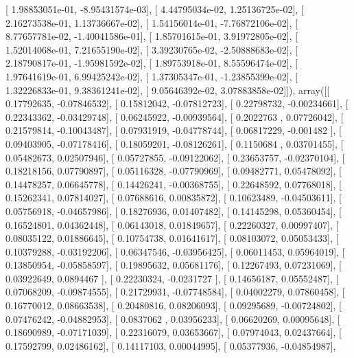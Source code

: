 \documentclass{article}
\begin{document}
       [  1.98853051e-01,  -8.95431574e-03],
       [  4.44795034e-02,   1.25136725e-02],
       [  2.16273538e-01,   1.13736667e-02],
       [  1.54156014e-01,  -7.76872106e-02],
       [  8.77657781e-02,  -1.40041586e-01],
       [  1.85701615e-01,   3.91972805e-02],
       [  1.52014068e-01,   7.21655190e-02],
       [  3.39230765e-02,  -2.50888683e-02],
       [  2.18790817e-01,  -1.95981592e-02],
       [  1.89753918e-01,   8.55596474e-02],
       [  1.97641619e-01,   6.99425242e-02],
       [  1.37305347e-01,  -1.23855399e-02],
       [  1.32226833e-01,   9.38361241e-02],
       [  9.05646392e-02,   3.07883858e-02]]), array([[ 0.17792635, -0.07846532],
       [ 0.15812042, -0.07812723],
       [ 0.22798732, -0.00234661],
       [ 0.22343362, -0.03429748],
       [ 0.06245922, -0.00939564],
       [ 0.2022763 ,  0.07726042],
       [ 0.21579814, -0.10043487],
       [ 0.07931919, -0.04778744],
       [ 0.06817229, -0.001482  ],
       [ 0.09403905, -0.07178416],
       [ 0.18059201, -0.08126261],
       [ 0.1150684 ,  0.03701455],
       [ 0.05482673,  0.02507946],
       [ 0.05727855, -0.09122062],
       [ 0.23653757, -0.02370104],
       [ 0.18218156,  0.07790897],
       [ 0.05116328, -0.07790969],
       [ 0.09482771,  0.05478092],
       [ 0.14478257,  0.06645778],
       [ 0.14426241, -0.00368755],
       [ 0.22648592,  0.07768018],
       [ 0.15262341,  0.07814027],
       [ 0.07688616,  0.00835872],
       [ 0.10623489, -0.04503611],
       [ 0.05756918, -0.04657986],
       [ 0.18276936,  0.01407482],
       [ 0.14145298,  0.05360454],
       [ 0.16524801,  0.04362448],
       [ 0.06143018,  0.01849657],
       [ 0.22260327,  0.00997407],
       [ 0.08035122,  0.01886645],
       [ 0.10754738,  0.01641617],
       [ 0.08103072,  0.05053433],
       [ 0.10379288, -0.03192206],
       [ 0.06347546, -0.03956425],
       [ 0.06011453,  0.05964019],
       [ 0.13850954, -0.05858597],
       [ 0.19895632,  0.05681176],
       [ 0.12267493,  0.07231069],
       [ 0.03922649,  0.0894467 ],
       [ 0.22230324, -0.0231727 ],
       [ 0.14656187,  0.05552487],
       [ 0.07068209, -0.09874555],
       [ 0.21729931, -0.07748584],
       [ 0.04002279,  0.07860458],
       [ 0.16770012,  0.08663538],
       [ 0.20480816,  0.08206093],
       [ 0.09295689, -0.00724802],
       [ 0.07476242, -0.04882953],
       [ 0.0837062 ,  0.03956233],
       [ 0.06620269,  0.00095648],
       [ 0.18690989, -0.07171039],
       [ 0.22316079,  0.03653667],
       [ 0.07974043,  0.02437664],
       [ 0.17592799,  0.02486162],
       [ 0.14117103,  0.00044995],
       [ 0.05377936, -0.04854987],
\end{document}
